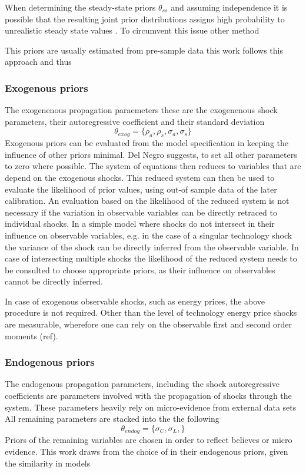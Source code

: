 \documentclass[12pt,a4paper,english]{article} %
\begin{document}
	When determining the steady-state priors $\theta_{ss}$ and assuming independence it is possible that the resulting joint prior distributions assigns high probability to unrealistic steady state values \cite{del_negro_forming_2008}. To circumvent this issue other method
	
	This priors are usually estimated from pre-sample data \cite{herbst_bayesian_2016}
	this work follows this approach and thus 	
	
	\subsubsection{Exogenous priors}
	The exogenenous propagation paraemeters 
	these are the exogenenous shock parameters, their autoregressive coefficient and their standard deviation
	\[
		\theta_{exog} = \{\rho_a, \rho_s, \sigma_a, \sigma_s \}
	\]
	Exogenous priors can be evaluated from the model specification in keeping the influence of other priors minimal. Del Negro suggests, to set all other parameters to zero where possible. The system of equations then reduces to variables that are depend on the exogenous shocks. This reduced system can then be used to evaluate the likelihood of prior values, using out-of sample data of the later calibration. 
	An evaluation based on the likelihood of the reduced system is not necessary if the variation in observable variables can be directly retraced to individual shocks. In a simple model where shocks do not intersect in their influence on observable variables, e.g. in the case of a singular technology shock the variance of the shock can be directly inferred from the observable variable. In case of intersecting multiple shocks the likelihood of the reduced system needs to be consulted to choose appropriate priors, as their influence on observables cannot be directly inferred. 
	
	In case of exogenous observable shocks, such as energy prices, the above procedure is not required. Other than the level of technology energy price shocks are measurable, wherefore one can rely on the observable first and second order moments (ref).
	
	\subsubsection{Endogenous priors}
	The endogenous propagation parameters, including the shock autoregressive coefficients are parameters involved with the propagation of shocks through the system.
	These parameters heavily rely on micro-evidence from external data sets \cite{del_negro_forming_2008}
	All remaining parameters are stacked into the the following
	\[
		\theta_{endog} = \{\sigma_C, \sigma_L, \}
	\]
	Priors of the remaining variables are chosen in order to reflect believes or micro evidence. This work draws from the choice of \cite{del_negro_forming_2008} in their endogenous priors, given the similarity in models
	
\end{document}
